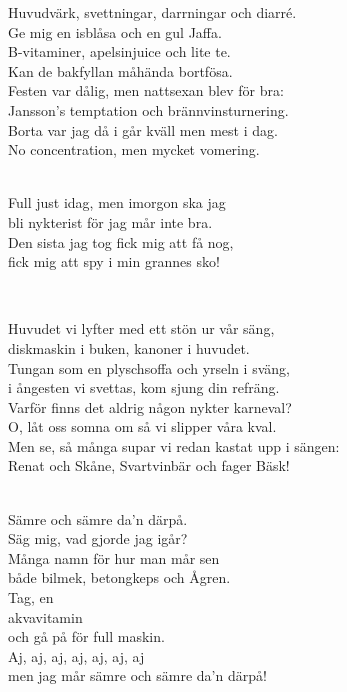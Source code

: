 \songtext{}Huvudvärk, svettningar, darrningar och diarré.\\
Ge mig en isblåsa och en gul Jaffa.\\
B-vitaminer, apelsinjuice och lite te.\\
Kan de bakfyllan måhända bortfösa.\\
Festen var dålig, men nattsexan blev för bra:\\
Jansson's temptation och brännvinsturnering.\\
Borta var jag då i går kväll men mest i dag.\\
No concentration, men mycket vomering.\\


 \\       

\songtext{} Full just idag, men imorgon ska jag \\
bli nykterist för jag mår inte bra. \\
Den sista jag tog fick mig att få nog, \\
fick mig att spy i min grannes sko! 

\newpage


 \\       

\songtext{}Huvudet vi lyfter med ett stön ur vår säng,\\ 
diskmaskin i buken, kanoner i huvudet.\\ 
Tungan som en plyschsoffa och yrseln i sväng,\\ 
i ångesten vi svettas, kom sjung din refräng.\\ 
Varför finns det aldrig någon nykter karneval?\\ 
O, låt oss somna om så vi slipper våra kval.\\ 
Men se, så många supar vi redan kastat upp i sängen:\\ 
Renat och Skåne, Svartvinbär och fager Bäsk!\\ 


 \\       

\songtext{}Sämre och sämre da'n därpå. \\
Säg mig, vad gjorde jag igår?\\
Många namn för hur man mår sen\\
både bilmek, betongkeps och Ågren.\\
Tag, en\\
akvavitamin\\
och gå på för full maskin.\\
Aj, aj, aj, aj, aj, aj, aj\\
men jag mår sämre och sämre da'n därpå!\\


